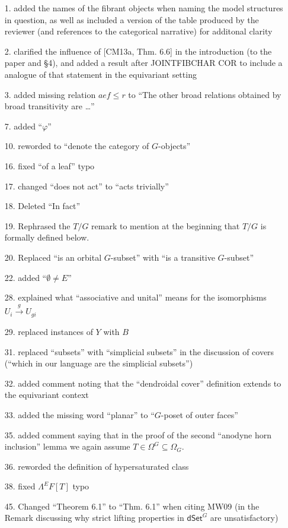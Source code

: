 \documentclass{article}
\begin{document}
\begin{itemize}
\item[1.] added the names of the fibrant objects when naming the model structures in question, as well as included a version of the table produced by the reviewer (and references to the categorical narrative) for additonal clarity
\item[2.] clarified the influence of [CM13a, Thm. 6.6] in the introduction (to the paper and \S 4), and added a result after JOINTFIBCHAR COR to include a analogue of that statement in the equivariant setting
\item[3.] added missing relation $aef \leq r$ to ``The other broad relations obtained by broad transitivity are \dots''
\item[7.] added ``$\varphi$''
\item[10.] reworded to ``denote the category of $G$-objects''
\item[16.] fixed ``of a leaf'' typo
\item[17.] changed ``does not act'' to ``acts trivially''
\item[18.] Deleted ``In fact''
\item[19.] Rephrased the $T/G$ remark to mention at the beginning that $T/G$ is formally defined below.
\item[20.] Replaced ``is an orbital $G$-subset'' with ``is a transitive $G$-subset''
\item[22.] added ``$\emptyset \neq E$''
\item[28.] explained what ``associative and unital'' means for the isomorphisms $U_i \xrightarrow{g} U_{gi}$
\item[29.] replaced instances of $Y$ with $B$
\item[31.] replaced ``subsets'' with ``simplicial subsets'' in the discussion of covers (``which in our language are the simplicial subsets'')
\item[32.] added comment noting that the ``dendroidal cover'' definition extends to the equivariant context
\item[33.] added the missing word ``planar'' to ``$G$-poset of outer faces''
\item[35.] added comment saying that in the proof of the second ``anodyne horn inclusion'' lemma we again assume $T \in \Omega^G \subseteq \Omega_G$.
\item[36.] reworded the definition of hypersaturated class
\item[38.] fixed $\Lambda^EF[T]$ typo
\item[45.] Changed ``Theorem 6.1'' to ``Thm. 6.1'' when citing MW09 (in the Remark discussing why strict lifting properties in $\mathsf{dSet}^G$ are unsatisfactory)

\end{itemize}
\end{document}
